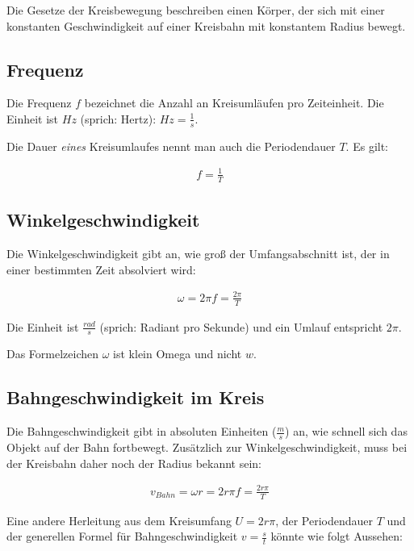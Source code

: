 Die Gesetze der Kreisbewegung beschreiben einen Körper, der sich mit einer konstanten Geschwindigkeit auf einer Kreisbahn mit konstantem Radius bewegt.


\subsection{Frequenz}

Die Frequenz $f$ bezeichnet die Anzahl an Kreisumläufen pro Zeiteinheit. Die Einheit ist $Hz$ (sprich: \glqq Hertz\grqq ):  $Hz = \frac{1}{s}$.

Die Dauer \emph{eines} Kreisumlaufes nennt man auch die Periodendauer $T$. Es gilt:

\begin{align}
	f = \frac{1}{T}
\end{align}

\subsection{Winkelgeschwindigkeit}

Die Winkelgeschwindigkeit gibt an, wie groß der Umfangsabschnitt ist, der in einer bestimmten Zeit absolviert wird:

\begin{align}
	\omega = 2 \pi f = \frac{2 \pi}{T}
\end{align}

\noindent Die Einheit ist $\frac{rad}{s}$ (sprich: \glqq Radiant pro Sekunde\grqq ) und ein Umlauf entspricht $2\pi$.

\begin{Wichtig}
Das Formelzeichen $\omega$ ist \glqq klein Omega\grqq{} und nicht \glqq $w$\grqq .
\end{Wichtig}


\subsection{Bahngeschwindigkeit im Kreis}

Die Bahngeschwindigkeit gibt in absoluten Einheiten ($\frac{m}{s}$) an, wie schnell sich das Objekt auf der Bahn fortbewegt. Zusätzlich zur Winkelgeschwindigkeit, muss bei der Kreisbahn daher noch der Radius bekannt sein:

\begin{align} \label{eq:bahngeschwindigkeit}
	v_{Bahn}=\omega r= 2r\pi f = \frac{2r\pi}{T}
\end{align}

Eine andere Herleitung aus dem Kreisumfang $U=2r\pi$, der Periodendauer $T$ und der generellen Formel für Bahngeschwindigkeit $v=\frac{s}{t}$ könnte wie folgt Aussehen:

